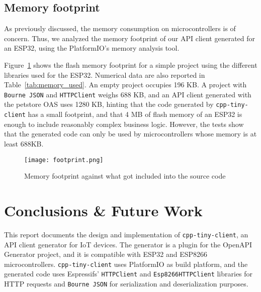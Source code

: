\documentclass[manuscript,screen]{acmart}
\begin{document}
\subsection{Memory footprint}\label{subsec:footprint}
As previously discussed, the memory consumption on microcontrollers is of concern. Thus, we analyzed the memory footprint of our API client generated for an ESP32, using the PlatformIO's memory analysis tool. 

Figure~\ref{fig:footprint} shows the flash memory footprint for a simple project using the different libraries used for the ESP32. 
Numerical data are also reported in Table~\ref{tab:memory_used}. 
An empty project occupies 196 KB. 
A project with \texttt{Bourne JSON} and \texttt{HTTPClient} weighs 688 KB, and an API client generated with the petstore OAS uses 1280 KB, hinting that the code generated by \texttt{cpp-tiny-client} has a small footprint, and that 4 MB of flash memory of an ESP32 is enough to include reasonably complex business logic. 
%
However, the tests show that the generated code can only be used by microcontrollers whose memory is at least 688KB. 

\begin{figure}[b!]
    \centering
    \texttt{[image: footprint.png]}
    \caption{Memory footprint against what got included into the source code}
    \label{fig:footprint}
\end{figure}









\section{Conclusions \& Future Work}\label{sec:limitation}



This report documents the design and implementation of \texttt{cpp-tiny-client}, an API client generator for IoT devices. The generator is a plugin for the OpenAPI Generator project, and it is compatible with ESP32 and ESP8266 microcontrollers. 
%
\texttt{cpp-tiny-client} uses PlatformIO as build platform, and the generated code uses Espressifs' \texttt{HTTPClient} and \texttt{Esp8266HTTPClient} libraries for HTTP requests and \texttt{Bourne JSON} for serialization and deserialization purposes. 
\end{document}
